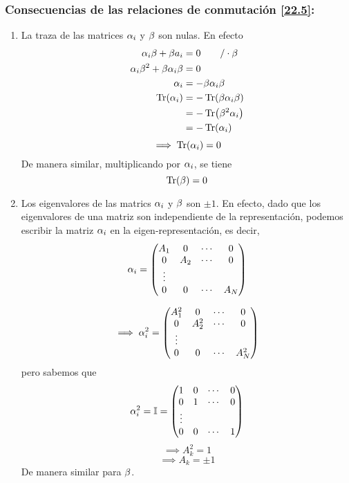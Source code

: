 \subsubsection{Consecuencias de las relaciones de conmutación \eqref{22.5}:}
\begin{enumerate}
	\item La traza de las matrices $\alpha_i$ y $\beta$ son nulas. En efecto
	\begin{align}
  \alpha_i\beta+\beta a_i&=0\qquad /\cdot\beta \\
  \alpha_i\beta ^2+\beta \alpha_i\beta &=0\\
  \alpha_i&=-\beta \alpha_i\beta \\
  \Tr(\alpha_i )&=-\Tr(\beta\alpha_i\beta)\\
  &=-\Tr(\beta^2\alpha_i)\\
  &=-\Tr(\alpha_i)
\end{align}
\begin{equation}
  \implies \Tr(\alpha_i )=0
\end{equation}
De manera similar, multiplicando por $\alpha_i$, se tiene
\begin{equation}
   \Tr(\beta  )=0
\end{equation}
\item Los eigenvalores de las matrics $\alpha_i$ y $\beta$ son $\pm 1$. En efecto, dado que los eigenvalores de una matriz son independiente de la representación, podemos escribir la matriz $\alpha_i$ en la eigen-representación, es decir, 
\begin{equation}
  \a_i=\mqty(A_1&0&\cdots & 0\\
  0&A_2&\cdots &0\\
  \vdots\\
  0&0&\cdots &A_N)
\end{equation}

\begin{equation}
 \implies  \a_i^2=\mqty(A_1^2&0&\cdots & 0\\
  0&A_2^2&\cdots &0\\
  \vdots\\
  0&0&\cdots &A_N^2)
\end{equation}
pero sabemos que
\begin{equation}
  \a_i^2=\id =\mqty(1&0&\cdots & 0\\
  0&1&\cdots &0\\
  \vdots\\
  0&0&\cdots &1)
\end{equation}
\begin{equation}
  \implies A_k^2=1
\end{equation}
\begin{equation}
  \implies \boxed{A_k=\pm 1}
\end{equation}
De manera similar para $\beta$.
\end{enumerate}

